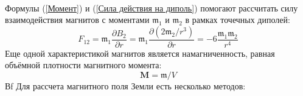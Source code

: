 \documentclass[a4paper, 10pt]{article}
\begin{document}
\paragraph{}
Формулы (\ref{Момент}) и (\ref{Сила действия на диполь}) помогают рассчитать силу взаимодействия магнитов с моментами $\mathfrak{m_{1}}$ и $\mathfrak{m_{2}}$ в рамках точечных диполей:
\begin{equation}
    F_{12} = \mathfrak{m}_{1}{\frac{\partial {B_{2}}}{\partial r}} = \mathfrak{m}_{1}\frac{\partial (2\mathfrak{m}_{2}/r^{3})}{\partial r}  =-6\frac{\mathfrak{m}_{1}\mathfrak{m}_{2}}{r^{4}}
    \label{Сила взаимодействия диполей}
\end{equation}
Еще одной характеристикой магнитов является намагниченность, равная объёмной плотности магнитного момента:
\begin{equation}
    \mathbf{M} = \mathfrak{m}/V
    \label{намагниченность}
\end{equation}
Вf\newline
Для рассчета магнитного поля Земли есть несколько методов:
\end{document}
